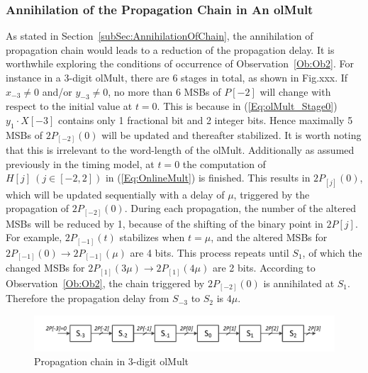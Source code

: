 \documentclass[a4paper, 11pt]{article}
\begin{document}
\subsubsection{Annihilation of the Propagation Chain in An olMult }
As stated in Section~\ref{subSec:AnnihilationOfChain}, the annihilation of propagation chain would leads to a reduction of the propagation delay. It is worthwhile exploring the conditions of occurrence of Observation~\ref{Ob:Ob2}. For instance in a 3-digit olMult, there are 6 stages in total, as shown in Fig.xxx. If $x_{-3}\neq0$ and/or $y_{-3}\neq0$, no more than 6 MSBs of $P[-2]$ will change with respect to the initial value at $t=0$. This is because in (\ref{Eq:olMult_Stage0}) $y_1\cdot X[-3]$ contains only 1 fractional bit and 2 integer bits. Hence maximally 5 MSBs of $2P_{[-2]}(0)$ will be updated and thereafter stabilized. It is worth noting that this is irrelevant to the word-length of the olMult. Additionally as assumed previously in the timing model, at $t=0$ the computation of $H[j]~(j\in[-2,2])$ in (\ref{Eq:OnlineMult}) is finished. This results in $2P_{[j]}(0)$, which will be updated sequentially with a delay of $\mu$, triggered by the propagation of $2P_{[-2]}(0)$. During each propagation, the number of the altered MSBs will be reduced by 1, because of the shifting of the binary point in $2P[j]$. For example, $2P_{[-1]}(t)$ stabilizes when $t=\mu$, and the altered MSBs for $2P_{[-1]}(0)\rightarrow2P_{[-1]}(\mu)$ are 4 bits. This process repeats until $S_1$, of which the changed MSBs for $2P_{[1]}(3\mu)\rightarrow2P_{[1]}(4\mu)$ are 2 bits. According to Observation~\ref{Ob:Ob2}, the chain triggered by $2P_{[-2]}(0)$ is annihilated at $S_1$. Therefore the propagation delay from $S_{-3}$ to $S_2$ is $4\mu$.
 

\begin{figure}[htbp]
  \includegraphics[width=\textwidth]{./Figures/OlMult_Stage.pdf}
  \caption{Propagation chain in 3-digit olMult}
\end{figure}
\end{document}
